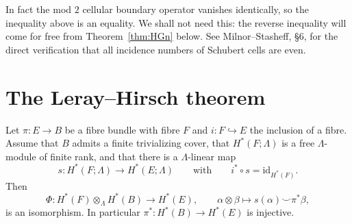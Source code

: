 \begin{remark}[quoted]
In fact the mod $2$ cellular boundary operator vanishes identically, so the
inequality above is an equality. We shall not need this: the reverse inequality
will come for free from Theorem~\ref{thm:HGn} below. See Milnor--Stasheff,
\S 6, for the direct verification that all incidence numbers of Schubert cells
are even.
\end{remark}

\section{The Leray--Hirsch theorem}

\begin{theorem}\label{thm:leray-hirsch}
Let $\pi\colon E\to B$ be a fibre bundle with fibre $F$ and
$i\colon F\hookrightarrow E$ the inclusion of a fibre. Assume that $B$ admits a
finite trivializing cover, that $H^*(F;\Lambda)$ is a free $\Lambda$-module of
finite rank, and that there is a $\Lambda$-linear map
\[
s\colon H^*(F;\Lambda)\longrightarrow H^*(E;\Lambda)
\qquad\text{with}\qquad
i^*\circ s=\mathrm{id}_{H^*(F)} .
\]
Then
\[
\Phi\colon H^*(F)\otimes_\Lambda H^*(B)\longrightarrow H^*(E),
\qquad
\alpha\otimes\beta\longmapsto s(\alpha)\smile\pi^*\beta,
\]
is an isomorphism. In particular $\pi^*\colon H^*(B)\to H^*(E)$ is injective.
\end{theorem}

